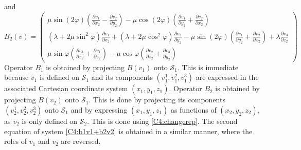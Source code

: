 and
\begin{equation}
B_2(v)=
\begin{pmatrix}
\mu \sin(2\varphi)\left( \frac{\partial v_1}{\partial x_2}-\frac{\partial v_2}{\partial y_2}\right)-\mu \cos(2\varphi)  \left( \frac{\partial v_1}{\partial y_2}+\frac{\partial v_2}{\partial x_2} \right)\\
(\lambda+2\mu \sin^2\varphi) \frac{\partial v_1}{\partial x_2}+(\lambda+2\mu \cos^2 \varphi)\frac{\partial v_2}{\partial y_2}-\mu \sin(2\varphi)  \left( \frac{\partial v_1}{\partial y_2}+\frac{\partial v_2}{\partial x_2} \right)+\lambda \frac{\partial v_3}{\partial z_2} \\
\mu\sin\varphi\left(\frac{\partial v_3}{\partial x_2}+\frac{\partial v_1}{\partial z_2} \right)-\mu\cos\varphi\left( \frac{\partial v_2}{\partial z_2} +\frac{\partial v_3}{\partial y_2} \right)
\end{pmatrix}
\label{C4:B2v2expl}
\end{equation}
Operator $B_1$ is obtained by projecting $B(v_1)$ onto $\mathcal{S}_1$. This is immediate because $v_1$ is defined on $\mathcal{S}_1$ and its components $(v_1^1,v_1^2,v_1^3)$ are expressed in the associated Cartesian coordinate system $(x_1,y_1,z_1)$. Operator $B_2$ is obtained by projecting $B(v_2)$ onto $\mathcal{S}_1$. This is done by projecting its components $(v_2^1,v_2^2,v_2^3)$ onto $\mathcal{S}_1$ and by expressing $(x_1,y_1,z_1)$ as functions of $(x_2,y_2,z_2)$, as $v_2$ is only defined on $\mathcal{S}_2$. This is done using \eqref{C4:changerep}. The second equation of system \eqref{C4:b1v1+b2v2} is obtained in a similar manner, where the roles of $v_1$ and $v_2$ are reversed.

